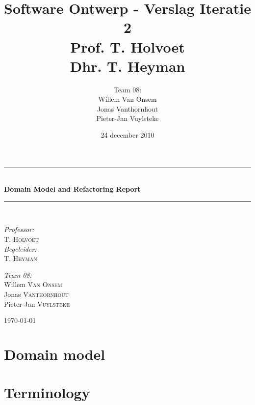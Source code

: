 \documentclass[a4paper]{article}
\title{Software Ontwerp - Verslag Iteratie 2\\Prof. T. Holvoet\\Dhr. T. Heyman}
\author{Team 08:\\Willem Van Onsem\\Jonas Vanthornhout\\Pieter-Jan Vuylsteke}
\date{24 december 2010}
\newcommand{\HRule}{\rule{\linewidth}{0.5mm}}
\begin{document}
\begin{empfile}
\begin{titlepage}
\begin{center}
\HRule \\[0.4cm]
{ \huge \bfseries Domain Model and Refactoring Report}\\[0.4cm]
\HRule \\[1.5cm]
\begin{minipage}{0.4\textwidth}
\begin{flushleft} \large
\emph{Professor:}\\
T. \textsc{Holvoet}\\
\emph{Begeleider:}\\
T. \textsc{Heyman}
\end{flushleft}
\end{minipage}
\begin{minipage}{0.4\textwidth}
\begin{flushright} \large
\emph{Team 08:} \\
Willem \textsc{Van Onsem}\\
Jonas \textsc{Vanthornhout}\\
Pieter-Jan \textsc{Vuylsteke}
\end{flushright}
\end{minipage}

\vfill

{\large \today}
\end{center}
\end{titlepage}
\newpage
\section{Domain model}
\section{Terminology}


\end{empfile}
\end{document}
